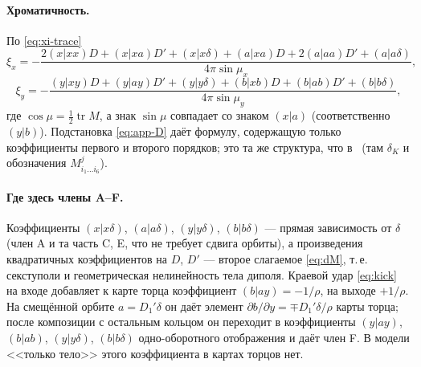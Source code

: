 \paragraph{Хроматичность.}
По \eqref{eq:xi-trace}
\begin{equation}
\label{eq:app-xix}
\xi_x=-\frac{
2(x|xx)D+(x|xa)D'+(x|x\delta)+(a|xa)D+2(a|aa)D'+(a|a\delta)
}{4\pi\sin\mu_x},
\end{equation}
\begin{equation}
\label{eq:app-xiy}
\xi_y=-\frac{
(y|xy)D+(y|ay)D'+(y|y\delta)+(b|xb)D+(b|ab)D'+(b|b\delta)
}{4\pi\sin\mu_y},
\end{equation}
где $\cos\mu=\tfrac12\operatorname{tr}M$, а знак $\sin\mu$ совпадает со знаком $(x|a)$ (соответственно $(y|b)$). Подстановка \eqref{eq:app-D} даёт формулу, содержащую только коэффициенты первого и второго порядков; это та же структура, что в~\cite{ValetovPhD} (там $\delta_K$ и обозначения $M^j_{i_1\dots i_6}$).

\paragraph{Где здесь члены A--F.}
Коэффициенты $(x|x\delta)$, $(a|a\delta)$, $(y|y\delta)$, $(b|b\delta)$ --- прямая зависимость от $\delta$ (член A и та часть C, E, что не требует сдвига орбиты), а произведения квадратичных коэффициентов на $D$, $D'$ --- второе слагаемое \eqref{eq:dM}, т.\,е. секступоли и геометрическая нелинейность тела диполя. Краевой удар \eqref{eq:kick} на входе добавляет к карте торца коэффициент $(b|ay)=-1/\rho$, на выходе $+1/\rho$. На смещённой орбите $a=D_1'\delta$ он даёт элемент $\partial b/\partial y=\mp D_1'\delta/\rho$ карты торца; после композиции с остальным кольцом он переходит в коэффициенты $(y|ay)$, $(b|ab)$, $(y|y\delta)$, $(b|b\delta)$ одно-оборотного отображения и даёт член F. В модели <<только тело>> этого коэффициента в картах торцов нет.
